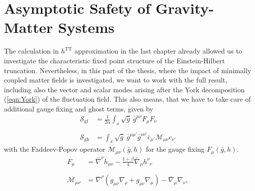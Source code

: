 \chapter{Asymptotic Safety of Gravity-Matter Systems}\label{chap:Matter} 
The calculation in $h^{\mathrm{TT}}$ approximation in the last chapter already allowed us to investigate the characteristic fixed point structure of the Einstein-Hilbert truncation. Nevertheless, in this part of the thesis, where the impact of minimally coupled matter fields is investigated, we want to work with the full result, including also the vector and scalar modes arising after the York decomposition (\ref{eqn:York}) of the fluctuation field. This also means, that we have to take care of additional gauge fixing and ghost terms, given by 
\begin{align}
\mathcal{S}_{\mathrm{gf}} &= \frac{1}{2\alpha} \int_x \sqrt{\bar{g}} \  \bar{g}^{\mu\nu} F_{\mu}F_{\nu}	\nonumber\\
\phantom{.} \\
\mathcal{S}_{\mathrm{gh}} &= \int_x \sqrt{\bar{g}} \  \bar{g}^{\mu\mu'} \bar{g}^{\nu\nu'}\bar{c}_{\mu'} \mathcal{M}_{\mu\nu}  c_{\nu'} \nonumber
\end{align}
with the Faddeev-Popov operator $\mathcal{M}_{\mu\nu}(\bar{g},h)$ for the gauge fixing $F_{\mu}(\bar{g},h)$. 
\begin{align}
	F_{\mu} &= \bar{\nabla}^{\nu}h_{\mu\nu} - \frac{1+\beta}{4}\bar{\nabla}_{\mu}h^{\nu}_{\phantom{\nu}\nu} \nonumber \\
	\phantom{.} \\
	\mathcal{M}_{\mu\nu} &= \bar{\nabla}^{\rho}(g_{\mu\nu}\nabla_{\rho} + g_{\rho\nu}\nabla_{\mu}) - \bar{\nabla}_{\mu}\nabla_{\nu}, \nonumber
\end{align}


 
